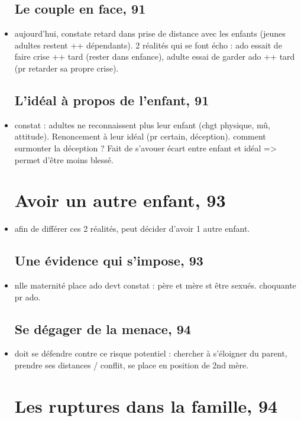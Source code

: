 \documentclass[12pt]{report}
\begin{document}
\begin{itemize}
\subsection{Le couple en face, 91}

\item aujourd'hui, constate retard dans prise de distance avec les enfants (jeunes adultes restent ++ dépendants). 2 réalités qui se font écho : ado essait de faire crise ++ tard (rester dans enfance), adulte essai de garder ado ++ tard (pr retarder sa propre crise). 

\subsection{L'idéal à propos de l'enfant, 91}

\item constat : adultes ne reconnaissent plus leur enfant (chgt physique, mû, attitude). Renoncement à leur idéal (pr certain, déception).  comment surmonter la déception ? Fait de s'avouer écart entre enfant et idéal =>  permet d'être moins blessé.

\section{Avoir un autre enfant, 93}
\item afin de différer ces 2 réalités, peut décider d'avoir 1 autre enfant. 

\subsection{Une évidence qui s'impose, 93}

\item nlle maternité place ado devt constat : père et mère st être sexués.  choquante pr ado. 

\subsection{Se dégager de la menace, 94}

\item doit se défendre contre ce risque potentiel : chercher à s'éloigner du parent, prendre ses distances / conflit, se place en position de 2nd mère. 

\section{Les ruptures dans la famille, 94}

\end{itemize}
\end{document}
